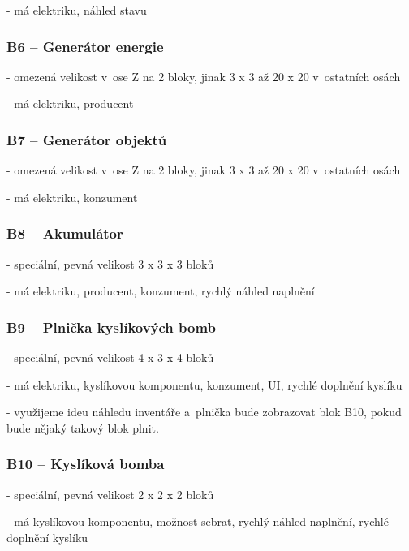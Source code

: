 - má elektriku, náhled stavu


\subsubsection{B6 -- Generátor energie}
\label{blocks:B6}
- omezená velikost v~ose Z na 2 bloky, jinak 3 x 3 až 20 x 20 v~ostatních osách

- má elektriku, producent


\subsubsection{B7 -- Generátor objektů}
\label{blocks:B7}
- omezená velikost v~ose Z na 2 bloky, jinak 3 x 3 až 20 x 20 v~ostatních osách

- má elektriku, konzument


\subsubsection{B8 -- Akumulátor}
\label{blocks:B8}
- speciální, pevná velikost 3 x 3 x 3 bloků

- má elektriku, producent, konzument, rychlý náhled naplnění


\subsubsection{B9 -- Plnička kyslíkových bomb}
\label{blocks:B9}
- speciální, pevná velikost 4 x 3 x 4 bloků

- má elektriku, kyslíkovou komponentu, konzument, UI, rychlé doplnění kyslíku

- využijeme ideu náhledu inventáře a~plnička bude zobrazovat blok B10, pokud bude nějaký takový blok plnit.


\subsubsection{B10 -- Kyslíková bomba}
\label{blocks:B10}
- speciální, pevná velikost 2 x 2 x 2 bloků

- má kyslíkovou komponentu, možnost sebrat, rychlý náhled naplnění, rychlé doplnění kyslíku


